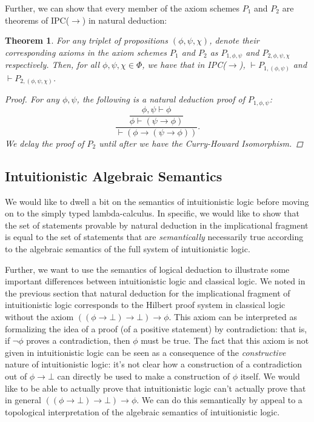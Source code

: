 \documentclass[12pt]{article}
\newtheorem{theorem}{Theorem}
\begin{document}
Further, we can show that every member of the axiom schemes $P_1$ and $P_2$ are theorems of IPC($\to$) in natural deduction: 
\begin{theorem}
For any triplet of propositions $(\phi, \psi,\chi)$, denote their corresponding axioms in the axiom schemes $P_1$ and $P_2$
as $P_{1,\phi,\psi}$ and $P_{2,\phi,\psi,\chi}$ respectively.  
Then, for all $\phi,\psi,\chi\in\Phi$, we have that in IPC($\to$), $\vdash P_{1,(\phi,\psi)}$ and $\vdash P_{2,(\phi,\psi,\chi)}$. 
\begin{proof}
For any $\phi,\psi$, the following is a natural deduction proof of $P_{1,\phi,\psi}$:
$$\frac{\dfrac{\phi ,\psi \vdash \phi }{\phi \vdash (\psi \to \phi )}}{\vdash (\phi \to (\psi \to \phi ))}.$$
We delay the proof of $P_2$ until after we have the Curry-Howard Isomorphism. 
\end{proof}
\end{theorem} 

\subsection{Intuitionistic Algebraic Semantics}
We would like to dwell a bit on the semantics of intuitionistic logic before moving on to the simply typed lambda-calculus. 
In specific, we would like to show that the set of statements provable by natural deduction in the implicational fragment 
is equal to the set of statements that are \textit{semantically} necessarily true according to the algebraic semantics
of the full system of intuitionistic logic. 

Further, we want to use the semantics of logical deduction to illustrate some important differences between intuitionistic logic
and classical logic. 
We noted in the previous section that natural deduction for the implicational fragment of intuitionistic logic corresponds to 
the Hilbert proof system in classical logic without the axiom $((\phi\to\bot)\to\bot)\to\phi$. 
This axiom can be interpreted as formalizing the idea of a proof (of a positive statement) by contradiction: 
that is, if $\neg\phi$ proves a contradiction, then $\phi$ must be true. 
The fact that this axiom is not given in intuitionistic logic can be seen as a consequence of the \textit{constructive} nature
of intuitionistic logic: it's not clear how a construction of a contradiction out of $\phi\to\bot$ can directly be used to make a
construction of $\phi$ itself.  
We would like to be able to actually prove that intuitionistic logic can't actually prove that in general $((\phi\to\bot)\to\bot)\to\phi$. 
We can do this semantically by appeal to a topological interpretation of the algebraic semantics of intuitionistic logic. 
\end{document}
